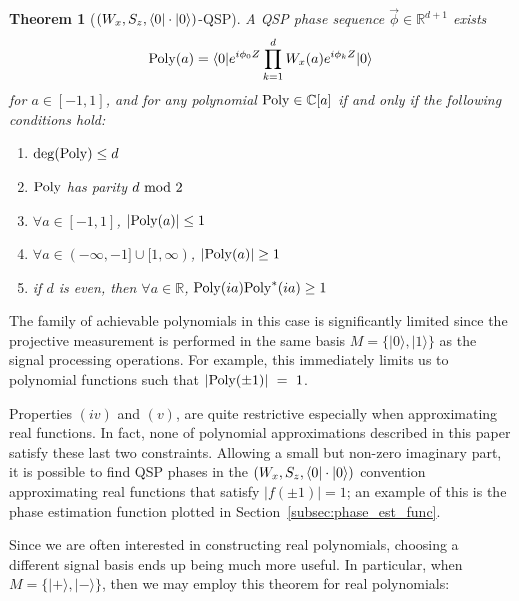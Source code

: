 \documentclass[aps,pra,showpacs,notitlepage,twocolumn,superscriptaddress,nofootinbib]{revtex4-1}
\newtheorem{theorem}{Theorem}
\def\>{\rangle}
\begin{document}
\begin{theorem}[$(W_x, S_z, \braket{0| \cdot | 0})$-QSP]
A QSP phase sequence $\vec\phi \in \mathbb{R}^{d+1}$ exists
\begin{equation}\label{eq:qsp_thm_Wx-Sz-00}
    {\rm Poly}(a) = \braket{0 | e^{i \phi_0 Z} \prod_{k=1}^d  W_x(a)  e^{i\phi_k Z} | 0}
\end{equation}
for $a\in[-1, 1]$, and for any polynomial ${\rm Poly} \in \mathbb{C}[a]$ if and only if the following conditions hold:
\begin{enumerate}[label=(\roman*)]
  \item ${\rm deg}({\rm Poly}) \leq d$
  \item ${\rm Poly}$ has parity $d~ {\rm mod}~ 2$
  \item $\forall a \in [-1, 1]$, $|{\rm Poly}(a)| \le 1$
  \item $\forall a \in (-\infty, -1] \cup [1, \infty)$, $|{\rm Poly}(a)| \ge 1$
  \item if $d$ is even, then $\forall a \in \mathbb{R}$, ${\rm Poly}(ia){\rm Poly}^*(ia) \ge 1$
\end{enumerate}
\label{thm:qsp_Wx-Sz-00}
\end{theorem}
The family of achievable polynomials in this case is significantly limited since the projective measurement is performed in the same basis $M = \{|0\>, |1\>\}$ as the signal processing operations.
For example, this immediately limits us to polynomial functions such that $|{\rm Poly}(\pm 1)|~=~1$.

Properties $(iv)$ and $(v)$, are quite restrictive especially when approximating real functions.
In fact, none of polynomial approximations described in this paper satisfy these last two constraints.
Allowing a small but non-zero imaginary part, it is possible to find QSP phases in the $(W_x, S_z, \braket{0| \cdot | 0})$ convention approximating real functions that satisfy $|f(\pm 1)| = 1$;
an example of this is the phase estimation function plotted in Section~\ref{subsec:phase_est_func}.

Since we are often interested in constructing real polynomials, choosing a different signal basis ends up being much more useful.   In particular, when $M=\{|+\>, |-\>\}$, then we may employ this theorem for real polynomials:
\end{document}
